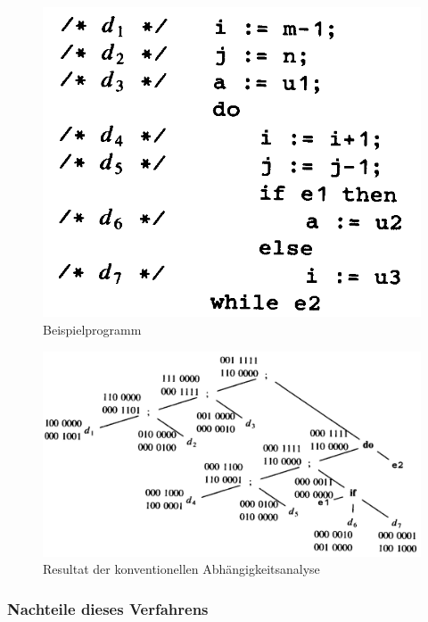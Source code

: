 \begin{figure}[p]
  \centering
  \includegraphics[scale=0.2]{images/bild3-1.png}
  \caption{Beispielprogramm}
  \label{fig:beispielprogramm}
\end{figure}

\begin{figure}[p]
  \centering
  \includegraphics[scale=0.2]{images/bild2-1.png}
  \caption{Resultat der konventionellen Abhängigkeitsanalyse}
  \label{fig:resultat}
\end{figure}

\subsubsection{Nachteile dieses Verfahrens}
\label{ssub:nachteile_dieses_verfahrens}

